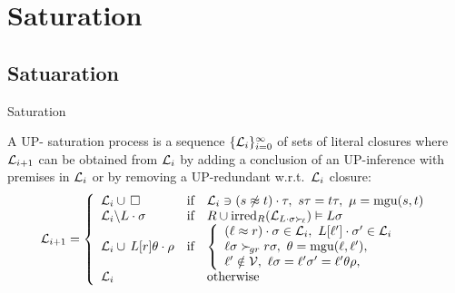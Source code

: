 \documentclass[%
]{beamer}
\begin{document}
\section{Saturation}
\subsection{Satuaration}
\begin{frame}[allowframebreaks]{Saturation}
    \begin{definition}
        A UP-{ saturation process} is
        a sequence \( \{ \mathcal{L}_i \}_{i=0}^\infty \)
        of sets of literal closures where
        \( \mathcal{L}_{i+1} \) can be obtained from
        \( \mathcal{L}_i \)
        by { adding} a conclusion of an UP-inference with premises in $\mathcal{L}_i$
        or by { removing} a UP-redundant w.r.t.~\(\mathcal{L}_i\) closure:
        \begin{gather*}
            \mathcal{L}_{i+1} = \left\{
                \begin{array}{lclc}
                    \mathcal{L}_i \cup\,\square
                    &\text{if}
                    &
                        \mathcal{L}_i\ni(s\not\approx t)\cdot\tau,\ {}
                        s\tau = t\tau,\ {}
                        \mu=\operatorname{mgu}(s,t)
                    \\
                    \mathcal{L}_i \backslash L\cdot\sigma
                    &\text{if}
                    &R \cup \operatorname{irred}_R(\mathcal{L}_{L\cdot\sigma\mathrel\succ_{\!\ell}}) \vDash L\sigma
                    \\
                    \mathcal{L}_i \cup\, L[r]\theta\cdot\rho
                    &\text{if}
                    &\left\{\begin{array}{l}
                        (\ell\approx r)\cdot\sigma\in\mathcal{L}_i,\ {}
                        L[\ell']\cdot\sigma'\in\mathcal{L}_i
                        \\
                        \ell\sigma\mathrel\succ_{\!gr} r\sigma,\ {}
                        \theta=\operatorname{mgu}(\ell,\ell'),
                        \\
                        \ell'\notin\mathcal{V},\ {}
                        \ell\sigma = \ell'\sigma' = \ell'\theta\rho,
                    \end{array}\right.
                    \\
                    \mathcal{L}_i
                    &&\text{otherwise}
                \end{array}
            \right.
        \end{gather*}
    \end{definition}
    \newpage


\end{frame}
\end{document}
